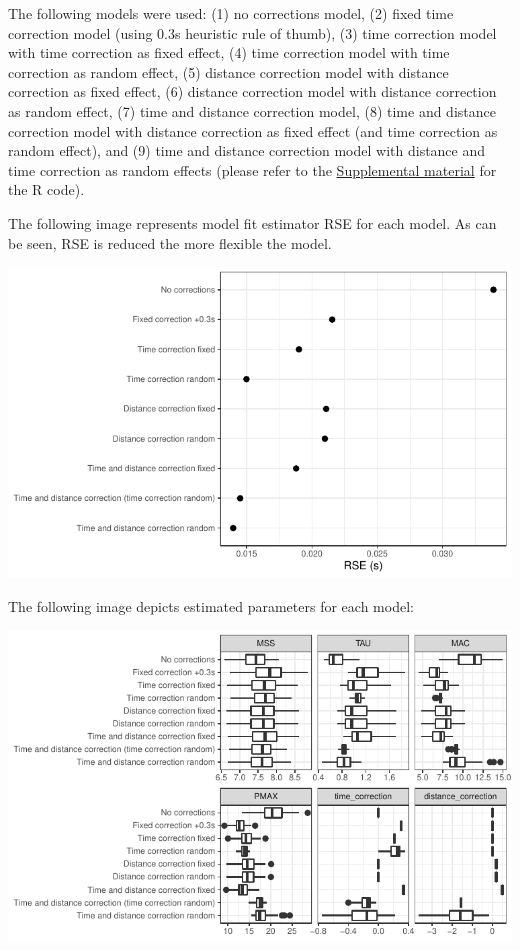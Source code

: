 \documentclass[fleqn,10pt]{wlpeerj} %
\begin{document}
\normalsize

The following models were used: (1) no corrections model, (2) fixed time correction model (using 0.3s heuristic rule of thumb), (3) time correction model with time correction as fixed effect, (4) time correction model with time correction as random effect, (5) distance correction model with distance correction as fixed effect, (6) distance correction model with distance correction as random effect, (7) time and distance correction model, (8) time and distance correction model with distance correction as fixed effect (and time correction as random effect), and (9) time and distance correction model with distance and time correction as random effects (please refer to the \protect\hyperlink{supplemental-material}{Supplemental material} for the R code).

\small

\normalsize

The following image represents model fit estimator RSE for each model. As can be seen, RSE is reduced the more flexible the model.

\small

\begin{center}\includegraphics[width=0.9\linewidth]{paper_files/figure-latex/unnamed-chunk-47-1} \end{center}

\normalsize

The following image depicts estimated parameters for each model:

\small

\begin{center}\includegraphics[width=0.9\linewidth]{paper_files/figure-latex/unnamed-chunk-48-1} \end{center}
\end{document}
